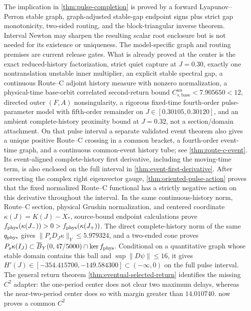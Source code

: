 The implication in \cref{thm:pulse-completion} is proved by a forward
Lyapunov--Perron stable graph, graph-adjusted stable-gap endpoint signs plus
strict gap monotonicity,
two-sided routing, and the block-triangular inverse theorem.  Interval Newton
may sharpen the resulting scalar root enclosure but is not needed for its
existence or uniqueness.  The model-specific graph and routing premises are
current release gates.  What is already proved
at the center is the exact reduced-history factorization, strict quiet
capture at \(J=0.30\), exactly one nontranslation unstable inner multiplier,
an explicit stable spectral gap, a continuous Route--C adjoint history
measure with nonzero normalization, a physical-time base-orbit correlated
second-return bound \(C^{uu}_{s,\mathrm{base}}<7.905650<12\), directed outer \((F,A)\)
nonsingularity, a rigorous fixed-time fourth-order pulse-parameter model
with fifth-order remainder on \(J\in[0.30105,0.30120]\), and an ambient
complete-history proximity bound at \(J=0.32\), not a section/domain
attachment.  On that pulse interval a
separate validated event theorem also gives a unique positive Route--C
crossing in a common bracket, a fourth-order event-time graph, and a
continuous common-event history tube; see \cref{thm:route-c-event}.  Its
event-aligned complete-history first derivative, including the moving-time
term, is also enclosed on the full interval in
\cref{thm:event-first-derivative}.  After correcting the complex right
eigenvector gauge, \cref{thm:oriented-pulse-action} proves that the fixed
normalized Route--C functional has a strictly negative action on this
derivative throughout the interval.  In the same continuous-history norm,
Route--C section, physical Grushin normalization, and centered coordinate
\(\kappa(J)=K(J)-X_*\), source-bound endpoint calculations prove
\(f_{\rm phys}(\kappa(J_-))>0>f_{\rm phys}(\kappa(J_+))\).  The direct
complete-history norm of the same \(q_{\rm phys}\) gives
\(\|P_sD_J\kappa\|_Y\le5.979324\), and a two-ended cone proves
\(P_s\kappa(I_J)\subset\overline B_Y(0,47/5000)\cap\ker f_{\rm phys}\).
Conditional on a quantitative graph whose stable domain contains this ball
and \(\sup\|D\psi\|\le16\), it gives
\(H'(J)\in[-354.415700,-149.584300]\subset(-\infty,0)\) on the full pulse
interval.  The general return theorem
\cref{thm:eventual-selected-return} identifies the missing \(C^2\) adapter:
the one-period center does not clear two maximum delays, whereas the
near-two-period center does so with margin greater than \(14.010740\).
 now proves a common \(C^2\)
